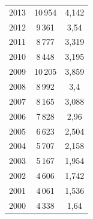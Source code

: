 \begin{table}
\begin{center}
\begin{tabular}{|c|c|c|}
2013&10\,954&4,142\\


2012&\hphantom{9}9\,361&3,54\hphantom{9}\\


2011&\hphantom{9}8\,777&3,319\\


2010&\hphantom{9}8\,448&3,195\\


2009&10\,205&3,859\\


2008&\hphantom{9}8\,992&3,4\hphantom{99}\\


2007&\hphantom{9}8\,165&3,088\\


2006&\hphantom{9}7\,828&2,96\hphantom{9}\\


2005&\hphantom{9}6\,623&2,504\\


2004&\hphantom{9}5\,707&2,158\\


2003&\hphantom{9}5\,167&1,954\\


2002&\hphantom{9}4\,606&1,742\\


2001&\hphantom{9}4\,061&1,536\\


2000&\hphantom{9}4\,338&1,64\hphantom{9}\\


\hline


\end{tabular}


\end{center}


\vspace*{-10pt}











\begin{center}




 \vspace*{2ex}



\end{center}
\end{table}
